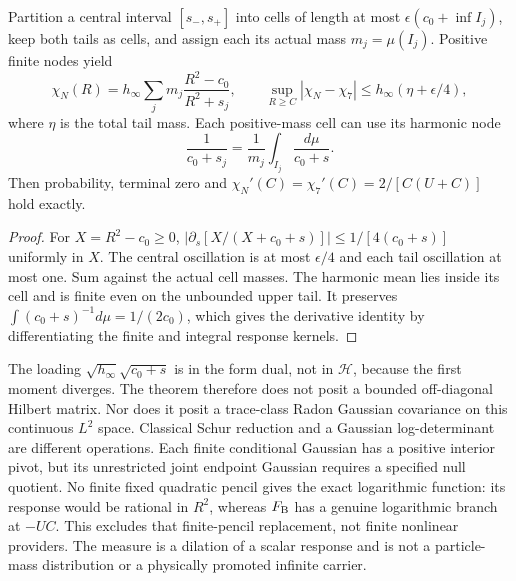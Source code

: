 \documentclass[12pt,a4paper]{article}
\begin{document}
\begin{corollary}
\label{p3d:cor:v2216-born-positive-approximation}
Partition a central interval $[s_-,s_+]$ into cells of length at most
$\epsilon(c_0+\inf I_j)$, keep both tails as cells, and assign each its
actual mass $m_j=\mu(I_j)$. Positive finite nodes yield
\[
 \chi_N(R)=h_\infty\sum_jm_j\frac{R^2-c_0}{R^2+s_j},\qquad
 \sup_{R\ge C}|\chi_N-\chi_7|
 \le h_\infty(\eta+\epsilon/4),
\]
where $\eta$ is the total tail mass. Each positive-mass cell can use its
harmonic node
\[
 \frac1{c_0+s_j}=\frac1{m_j}\int_{I_j}\frac{d\mu}{c_0+s}.
\]
Then probability, terminal zero and
$\chi_N'(C)=\chi_7'(C)=2/[C(U+C)]$ hold exactly.
\end{corollary}
\begin{proof}
For $X=R^2-c_0\ge0$,
$|\partial_s[X/(X+c_0+s)]|\le1/[4(c_0+s)]$ uniformly in $X$.
The central oscillation is at most $\epsilon/4$ and each tail oscillation
at most one. Sum against the actual cell masses. The harmonic mean lies
inside its cell and is finite even on the unbounded upper tail. It
preserves $\int(c_0+s)^{-1}d\mu=1/(2c_0)$, which gives the derivative
identity by differentiating the finite and integral response kernels.
\end{proof}

\begin{remark}
The loading $\sqrt{h_\infty}\sqrt{c_0+s}$ is in the form dual, not in
$\mathcal H$, because the first moment diverges. The theorem therefore
does not posit a bounded off-diagonal Hilbert matrix. Nor does it posit a
trace-class Radon Gaussian covariance on this continuous $L^2$ space.
Classical Schur reduction and a Gaussian log-determinant are different
operations. Each finite conditional Gaussian has a positive interior pivot,
but its unrestricted joint endpoint Gaussian requires a specified null
quotient. No finite fixed quadratic pencil gives the exact logarithmic
function: its response would be rational in $R^2$, whereas
$F_{\rm B}$ has a genuine logarithmic branch at $-UC$. This excludes
that finite-pencil replacement, not finite nonlinear providers. The measure
is a dilation of a scalar response and is not a particle-mass distribution
or a physically promoted infinite carrier.
\end{remark}
\end{document}

